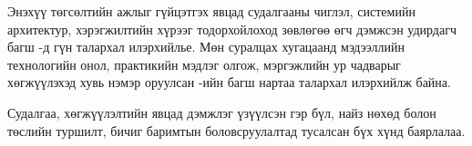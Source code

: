 \begin{acknowledgements}
\addchaptertocentry{\acknowledgementname}

Энэхүү төгсөлтийн ажлыг гүйцэтгэх явцад судалгааны чиглэл, системийн архитектур, хэрэгжилтийн хүрээг тодорхойлоход зөвлөгөө өгч дэмжсэн удирдагч багш \supname-д гүн талархал илэрхийлье. Мөн суралцах хугацаанд мэдээллийн технологийн онол, практикийн мэдлэг олгож, мэргэжлийн ур чадварыг хөгжүүлэхэд хувь нэмэр оруулсан \facname-ийн багш нартаа талархал илэрхийлж байна.

Судалгаа, хөгжүүлэлтийн явцад дэмжлэг үзүүлсэн гэр бүл, найз нөхөд болон төслийн туршилт, бичиг баримтын боловсруулалтад тусалсан бүх хүнд баярлалаа.

\end{acknowledgements}
